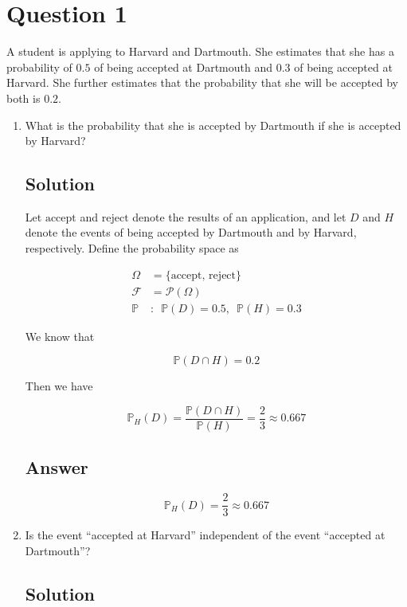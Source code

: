 \documentclass[12pt]{article}
\newcommand{\bP}{\mathbb{P}}
\begin{document}
	
	\section*{Question 1}
	
	\noindent A student is applying to Harvard and Dartmouth. She estimates that she has a probability of $0.5$ of being accepted at Dartmouth and $0.3$ of being accepted at Harvard. She further estimates that the probability that she will be accepted by both is $0.2$.
	
	\bigskip
	
	\begin{enumerate}[start=1,label={\bfseries Part \arabic*:},leftmargin=0in]
		\bigskip\item What is the probability that she is accepted by Dartmouth if she is accepted by Harvard?
		
		\subsection*{Solution}
		
			Let $\mathrm{accept}$ and $\mathrm{reject}$ denote the results of an application, and let $D$ and $H$ denote the events of being accepted by Dartmouth and by Harvard, respectively. Define the probability space as
		
			\[
			\begin{aligned}
				\Omega &= \{\mathrm{accept},\,\mathrm{reject}\}\\
				\mathcal{F} &= \mathcal{P}(\Omega)\\
				\bP &:\enspace \bP(D) = 0.5,\enspace \bP(H) = 0.3
			\end{aligned}
			\]
			
			We know that
			
			\[\bP(D\cap H) = 0.2\]
			
			Then we have
			
			\[\bP_H(D) = \frac{\bP(D\cap H)}{\bP(H)} = \frac{2}{3} \approx 0.667\]
		
		\subsection*{Answer}
		
			\[\boxed{\bP_H(D) = \frac{2}{3} \approx 0.667}\]
		
		\bigskip\item Is the event “accepted at Harvard” independent of the event “accepted at Dartmouth”?
		
		\subsection*{Solution}
		

\end{enumerate}
\end{document}
